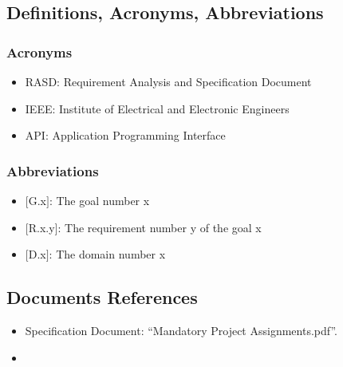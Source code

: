 \subsection{Definitions, Acronyms, Abbreviations}

\subsubsection{Acronyms}
\renewcommand{\labelitemi}{$-$}
\begin{itemize}
\item
RASD: Requirement Analysis and Specification Document
\item
IEEE: Institute of Electrical and Electronic Engineers
\item
API: Application Programming Interface
\end{itemize}

\subsubsection{Abbreviations}
\renewcommand{\labelitemi}{$-$}
\begin{itemize}
\item
$[$G.x$]$: The goal number x
\item
$[$R.x.y$]$: The requirement number y of the goal x
\item
$[$D.x$]$: The domain number x
\end{itemize}

\subsection{Documents References}
\renewcommand{\labelitemi}{$-$}
\begin{itemize}
\item
Specification Document: “Mandatory Project Assignments.pdf”.
\item
\href{http://ieeexplore.ieee.org/servlet/opac?punumber=6146377}{\color{Black}{IEEE Std 29148-2011 - ISO/IEC/IEEE International Standard - Systems and software engineering}}
\end{itemize}